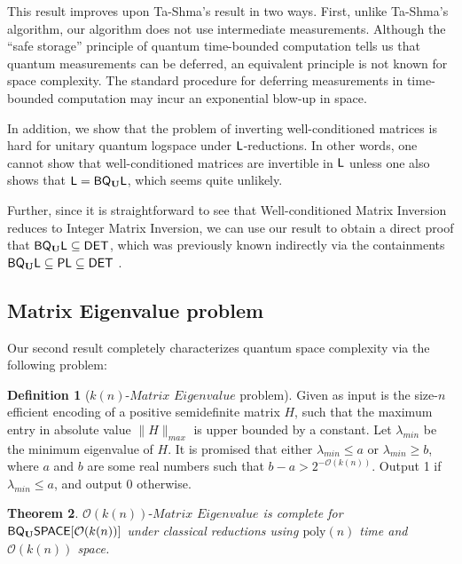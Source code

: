 \documentclass[11pt]{article}
\newtheorem{theorem}{Theorem}
\theoremstyle{definition}
\newtheorem{definition}[theorem]{Definition}
\theoremstyle{remark}
\newcommand\DET{{\sf{DET}}}
\newcommand\PLclass{{\sf{PL}}}
\newcommand\Logspace{{\sf{L}}}
\newcommand\spechamiltonian[1]{#1\textit{-Matrix Eigenvalue}}
\newcommand{\classfont}{\sf}
\newcommand{\Unitary}{\mathbf{U}}
\newcommand{\unitaryBQL}{{\classfont{BQ}_\Unitary\classfont{L}}}
\newcommand{\unitaryBQSPACE}[1]{{\classfont{BQ}_\Unitary\classfont{SPACE}}[#1]}
\newcommand\bigoh{\mathcal{O}}
\newcommand{\cl}[1]{{\color{purple}{[{\bf cl:}#1]}}}
\newcommand{\poly}{\textrm{poly}}
\begin{document}
This result improves upon Ta-Shma's result \cite{tashma} in two ways. First, unlike Ta-Shma's algorithm, our algorithm does not use intermediate measurements.  Although the ``safe storage'' principle of quantum time-bounded computation tells us that quantum measurements can be deferred, an equivalent principle is not known for space complexity.  The standard procedure for deferring measurements in time-bounded computation may incur an exponential blow-up in space.  

In addition, we show that the problem of inverting well-conditioned matrices is hard for unitary quantum logspace under $\Logspace$-reductions. In other words, one cannot show that well-conditioned matrices are invertible in $\Logspace$ unless one also shows that $\Logspace=\unitaryBQL$, which seems quite unlikely.

Further, since it is straightforward to see that Well-conditioned Matrix Inversion reduces to Integer Matrix Inversion, we can use our result to obtain a direct proof that $\unitaryBQL\subseteq\DET$, which was previously known indirectly via the containments $\unitaryBQL\subseteq\PLclass\subseteq\DET$ \cite{Watrous03,Borodin84}.

\subsection{Matrix Eigenvalue problem} 
Our second result completely characterizes quantum space complexity via the following problem:
\begin{definition}[$\spechamiltonian{k(n)}$ problem] \label{def: spechamiltonian}
Given as input is the size-$n$ efficient encoding of a positive semidefinite matrix $H$, such that the maximum entry in absolute value $\|H\|_{max}$ is upper bounded by a constant. Let $\lambda_{min}$ be the minimum eigenvalue of $H$. It is promised that either $\lambda_{min} \le a$ or $\lambda_{min} \ge b$, where $a$ and $b$ are some real numbers such that $b-a > 2^{-\mathcal{O}(k(n))}$. Output 1 if $\lambda_{min} \le a$, and output 0 otherwise.
\end{definition}

\begin{theorem} \label{thm: spechamiltonian}
$\spechamiltonian{\mathcal{O}(k(n))}$ is complete for $\unitaryBQSPACE{\mathcal{O}(k(n))}$ under classical reductions using $\poly(n)$ time and $\mathcal{O}(k(n))$ space.
\end{theorem}
\end{document}

